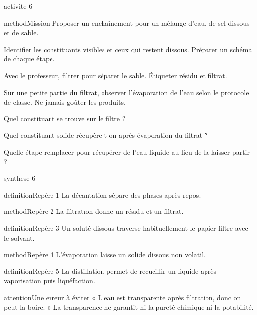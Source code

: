 \documentclass[12pt,twoside,openany]{book}
\begin{document}
\label{ch-6-activite}
\begin{pcFiche}{activite-6}
\begin{pcEncadre}{method}{Mission}
Proposer un enchaînement pour un mélange d’eau, de sel dissous et de sable.\par
\end{pcEncadre}
\begin{questions}
\item Identifier les constituants visibles et ceux qui restent dissous. Préparer un schéma de chaque étape.
\item Avec le professeur, filtrer pour séparer le sable. Étiqueter résidu et filtrat.
\item Sur une petite partie du filtrat, observer l’évaporation de l’eau selon le protocole de classe. Ne jamais goûter les produits.
\end{questions}
\begin{questions}
\item Quel constituant se trouve sur le filtre ?
\item Quel constituant solide récupère-t-on après évaporation du filtrat ?
\item Quelle étape remplacer pour récupérer de l’eau liquide au lieu de la laisser partir ?
\end{questions}
\end{pcFiche}
\label{ch-6-bilan}
\begin{pcFiche}{synthese-6}
\begin{pcEncadre}{definition}{Repère 1}
La décantation sépare des phases après repos.\par
\end{pcEncadre}
\begin{pcEncadre}{method}{Repère 2}
La filtration donne un résidu et un filtrat.\par
\end{pcEncadre}
\begin{pcEncadre}{definition}{Repère 3}
Un soluté dissous traverse habituellement le papier-filtre avec le solvant.\par
\end{pcEncadre}
\begin{pcEncadre}{method}{Repère 4}
L’évaporation laisse un solide dissous non volatil.\par
\end{pcEncadre}
\begin{pcEncadre}{definition}{Repère 5}
La distillation permet de recueillir un liquide après vaporisation puis liquéfaction.\par
\end{pcEncadre}
\begin{pcEncadre}{attention}{Une erreur à éviter}
« L’eau est transparente après filtration, donc on peut la boire. » La transparence ne garantit ni la pureté chimique ni la potabilité.\par
\end{pcEncadre}
\end{pcFiche}
\end{document}
